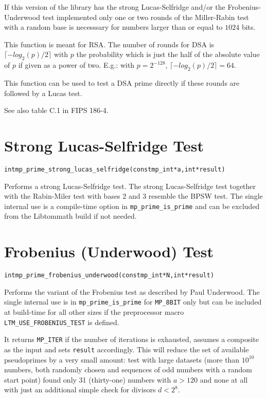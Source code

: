 \documentclass[synpaper]{book}
\begin{document}
If this version of the library has the strong Lucas-Selfridge and/or the Frobenius-Underwood test implemented only one or two rounds of the Miller-Rabin test with a random base is necesssary for numbers larger than or equal to $1024$ bits.

This function is meant for RSA. The number of rounds for DSA is $\lceil -log_2(p)/2\rceil$ with $p$ the probability which is just the half of the absolute value of $p$ if given as a power of two. E.g.: with $p = 2^{-128}$, $\lceil -log_2(p)/2\rceil = 64$.

This function can be used to test a DSA prime directly if these rounds are followed by a Lucas test.

See also table C.1 in FIPS 186-4.

\section{Strong Lucas-Selfridge Test}
\begin{alltt}
int mp_prime_strong_lucas_selfridge(const mp_int *a, int *result)
\end{alltt}
Performs a strong Lucas-Selfridge test. The strong Lucas-Selfridge test together with the Rabin-Miler test with bases $2$ and $3$ resemble the BPSW test. The single internal use is a compile-time option in \texttt{mp\_prime\_is\_prime} and can be excluded
from the Libtommath build if not needed.

\section{Frobenius (Underwood)  Test}
\begin{alltt}
int mp_prime_frobenius_underwood(const mp_int *N, int *result)
\end{alltt}
Performs the variant of the Frobenius test as described by Paul Underwood. The single internal use is in
\texttt{mp\_prime\_is\_prime} for \texttt{MP\_8BIT} only but can be included at build-time for all other sizes
if the preprocessor macro \texttt{LTM\_USE\_FROBENIUS\_TEST} is defined.

It returns \texttt{MP\_ITER} if the number of iterations is exhausted, assumes a composite as the input and sets \texttt{result} accordingly. This will reduce the set of available pseudoprimes by a very small amount: test with large datasets (more than $10^{10}$ numbers, both randomly chosen and sequences of odd numbers with a random start point) found only 31 (thirty-one) numbers with $a > 120$ and none at all with just an additional simple check for divisors $d < 2^8$.
\end{document}
